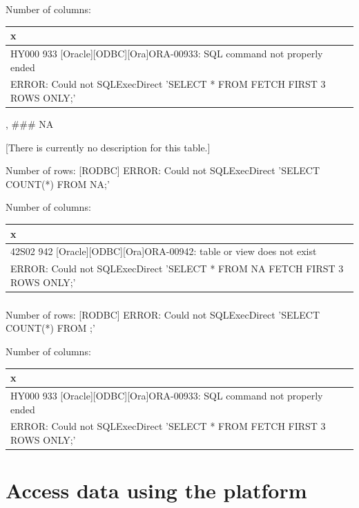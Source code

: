 \documentclass[
  letterpaper,
  oneside,
  open=any]{scrbook}
\begin{document}
Number of columns:

\begin{tabular}{l}
\hline
x\\
\hline
HY000 933 [Oracle][ODBC][Ora]ORA-00933: SQL command not properly ended\\
\hline
[RODBC] ERROR: Could not SQLExecDirect 'SELECT *
    FROM 
    FETCH FIRST 3 ROWS ONLY;'\\
\hline
\end{tabular}

, \#\#\# NA

{[}There is currently no description for this table.{]}

Number of rows: {[}RODBC{]} ERROR: Could not SQLExecDirect 'SELECT
COUNT(*) FROM NA;'

Number of columns:

\begin{tabular}{l}
\hline
x\\
\hline
42S02 942 [Oracle][ODBC][Ora]ORA-00942: table or view does not exist\\
\hline
[RODBC] ERROR: Could not SQLExecDirect 'SELECT *
    FROM NA
    FETCH FIRST 3 ROWS ONLY;'\\
\hline
\end{tabular}

\hypertarget{section-611}{%
\subsection{}\label{section-611}}

Number of rows: {[}RODBC{]} ERROR: Could not SQLExecDirect 'SELECT
COUNT(*) FROM ;'

Number of columns:

\begin{tabular}{l}
\hline
x\\
\hline
HY000 933 [Oracle][ODBC][Ora]ORA-00933: SQL command not properly ended\\
\hline
[RODBC] ERROR: Could not SQLExecDirect 'SELECT *
    FROM 
    FETCH FIRST 3 ROWS ONLY;'\\
\hline
\end{tabular}

\hypertarget{access-data-using-the-platform}{%
\chapter{Access data using the
platform}\label{access-data-using-the-platform}}
\end{document}

